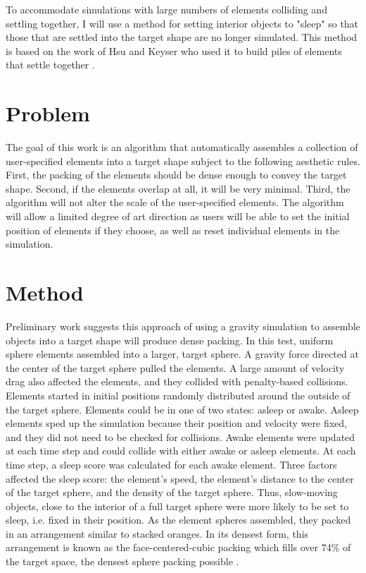 \documentclass{article}
\begin{document}
To accommodate simulations with large numbers of elements colliding and settling together, I will use a method for setting interior objects to "sleep" so that those that are settled into the target shape are no longer simulated.  This method is based on the work of Hsu and Keyser who used it to build piles of elements that settle together \cite{Hsu2010}.

\section{Problem}

	
	The goal of this work is an algorithm that automatically assembles a collection of user-specified elements into a target shape subject to the following aesthetic rules.  First, the packing of the elements should be dense enough to convey the target shape.  Second, if the elements overlap at all, it will be very minimal.  Third, the algorithm will not alter the scale of the user-specified elements.  The algorithm will allow a limited degree of art direction as users will be able to set the initial position of elements if they choose, as well as reset individual elements in the simulation.

\section{Method}

	
	Preliminary work suggests this approach of using a gravity simulation to assemble objects into a target shape will produce dense packing.  In this test, uniform sphere elements assembled into a larger, target sphere.  A gravity force directed at the center of the target sphere pulled the elements.  A large amount of velocity drag also affected the elements, and they collided with penalty-based collisions.  Elements started in initial positions randomly distributed around the outside of the target sphere.  Elements could be in one of two states: asleep or awake.  Asleep elements sped up the simulation because their position and velocity were fixed, and they did not need to be checked for collisions.  Awake elements were updated at each time step and could collide with either awake or asleep elements.  At each time step, a sleep score was calculated for each awake element.  Three factors affected the sleep score: the element's speed, the element's distance to the center of the target sphere, and the density of the target sphere.  Thus, slow-moving objects, close to the interior of a full target sphere were more likely to be set to sleep, i.e. fixed in their position.  As the element spheres assembled, they packed in an arrangement similar to stacked oranges.  In its densest form, this arrangement is known as the face-centered-cubic packing which fills over 74\% of the target space, the densest sphere packing possible \cite{Sloane1984,Hales1992}.
\end{document}
